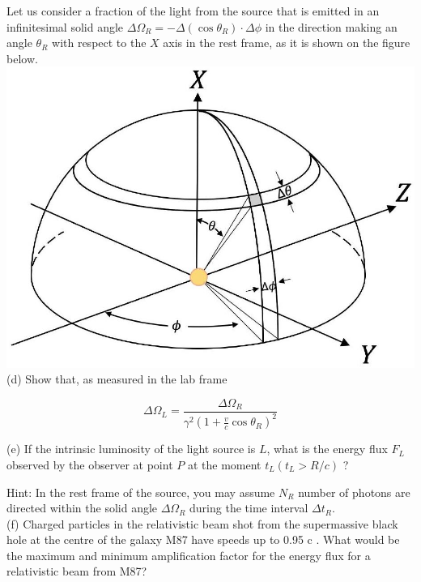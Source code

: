 \documentclass[10pt]{article}
\begin{document}
Let us consider a fraction of the light from the source that is emitted in an infinitesimal solid angle $\Delta \Omega_{R}=-\Delta\left(\cos \theta_{R}\right) \cdot \Delta \phi$ in the direction making an angle $\theta_{R}$ with respect to the $X$ axis in the rest frame, as it is shown on the figure below.\\
\includegraphics[max width=\textwidth, center]{2025_09_11_6312450c103d6a7e5736g-10(1)}\\
(d) Show that, as measured in the lab frame


\begin{equation*}
\Delta \Omega_{L}=\frac{\Delta \Omega_{R}}{\gamma^{2}\left(1+\frac{v}{c} \cos \theta_{R}\right)^{2}} \tag{10pt}
\end{equation*}


(e) If the intrinsic luminosity of the light source is $L$, what is the energy flux $F_{L}$ observed by the observer at point $P$ at the moment $t_{L}\left(t_{L}>R / c\right)$ ?

Hint: In the rest frame of the source, you may assume $N_{R}$ number of photons are directed within the solid angle $\Delta \Omega_{R}$ during the time interval $\Delta t_{R}$.\\
(f) Charged particles in the relativistic beam shot from the supermassive black hole at the centre of the galaxy M87 have speeds up to 0.95 c . What would be the maximum and minimum amplification factor for the energy flux for a relativistic beam from M87?
\end{document}
